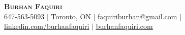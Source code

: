 \begin{center}
    \textbf{\Huge \scshape Burhan Faquiri} \\ \vspace{1pt}
    \small 647-563-5093 $|$ Toronto, ON $|$ {faquiriburhan@gmail.com} $|$ 
    \href{https://www.linkedin.com/in/burhanfaquiri/}{\underline{linkedin.com/burhanfaquiri}} $|$
    \href{https://www.burhanfaquiri.com}{\underline{burhanfaquiri.com}}
\end{center}